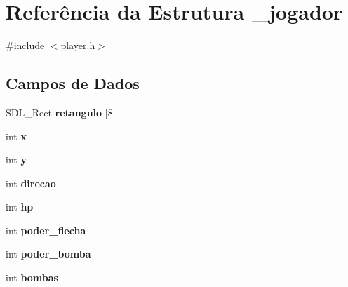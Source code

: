 \hypertarget{struct__jogador}{
\section{Referência da Estrutura \_\-jogador}
\label{struct__jogador}
}


{\ttfamily \#include $<$player.h$>$}

\subsection*{Campos de Dados}
\begin{DoxyCompactItemize}
\item 
\hypertarget{struct__jogador_a10a4d4bb1fa867a1c3a9bc2ab9ee7e9d}{
SDL\_\-Rect {\bfseries retangulo} \mbox{[}8\mbox{]}}
\label{struct__jogador_a10a4d4bb1fa867a1c3a9bc2ab9ee7e9d}

\item 
\hypertarget{struct__jogador_a6150e0515f7202e2fb518f7206ed97dc}{
int {\bfseries x}}
\label{struct__jogador_a6150e0515f7202e2fb518f7206ed97dc}

\item 
\hypertarget{struct__jogador_a0a2f84ed7838f07779ae24c5a9086d33}{
int {\bfseries y}}
\label{struct__jogador_a0a2f84ed7838f07779ae24c5a9086d33}

\item 
\hypertarget{struct__jogador_a05818f82142eb45301bf89e8939bb8ae}{
int {\bfseries direcao}}
\label{struct__jogador_a05818f82142eb45301bf89e8939bb8ae}

\item 
\hypertarget{struct__jogador_a9aa790f93d2d067a4f5608fdb8409f94}{
int {\bfseries hp}}
\label{struct__jogador_a9aa790f93d2d067a4f5608fdb8409f94}

\item 
\hypertarget{struct__jogador_a5819a445ff2fb05f613477829c04f115}{
int {\bfseries poder\_\-flecha}}
\label{struct__jogador_a5819a445ff2fb05f613477829c04f115}

\item 
\hypertarget{struct__jogador_a7ba2606514453e5bedf98b5510b8169e}{
int {\bfseries poder\_\-bomba}}
\label{struct__jogador_a7ba2606514453e5bedf98b5510b8169e}

\item 
\hypertarget{struct__jogador_a06e0ae6abeebe6c53b256cca1e00fedf}{
int {\bfseries bombas}}
\label{struct__jogador_a06e0ae6abeebe6c53b256cca1e00fedf}

\end{DoxyCompactItemize}


